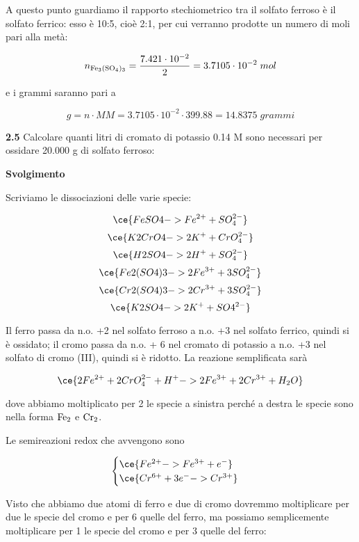 A questo punto guardiamo il rapporto stechiometrico tra il solfato ferroso è il solfato ferrico: esso è 10:5, cioè 2:1, per cui verranno prodotte un numero di moli pari alla metà:

$$n_{\rm Fe_3(SO_4)_3}=\frac{7.421 \cdot 10^{-2}}{2}=3.7105 \cdot 10^{-2}\;mol$$

e i grammi saranno pari a 

$$g=n \cdot MM=3.7105 \cdot 10^{-2} \cdot 399.88=14.8375\;grammi$$

\vspace{0.2cm}\textbf{2.5} Calcolare quanti litri di cromato di potassio 0.14 M sono necessari per ossidare 20.000 g di solfato ferroso:
\begin{center}

\end{center}

\large\textbf{Svolgimento}\normalsize

\vspace{0.2cm}Scriviamo le dissociazioni delle varie specie:

$$\ce{FeSO4 -> Fe^{2+} + SO_4^{2-}}$$
$$\ce{K2CrO4 -> 2K^+ + CrO_4^{2-}}$$
$$\ce{H2SO4 -> 2H^+ + SO_4^{2-}}$$
$$\ce{Fe2(SO4)3 -> 2Fe^{3+} + 3SO_4^{2-}}$$
$$\ce{Cr2(SO4)3 -> 2Cr^{3+} + 3SO_4^{2-}}$$
$$\ce{K2SO4 -> 2K^+ + SO4^{2-}}$$

Il ferro passa da n.o. +2 nel solfato ferroso a n.o. +3 nel solfato ferrico, quindi si è ossidato; il cromo passa da n.o. + 6 nel cromato di potassio a n.o. +3 nel solfato di cromo (III), quindi si è ridotto. La reazione semplificata sarà

$$\ce{2Fe^{2+} + 2CrO_4^{2-} + H^+ -> 2Fe^{3+} + 2Cr^{3+} + H_2O}$$

dove abbiamo moltiplicato per 2 le specie a sinistra perché a destra le specie sono nella forma $\rm Fe_2$ e $\rm Cr_2$.

Le semireazioni redox che avvengono sono

$$\begin{cases}
    \ce{Fe^{2+} -> Fe^{3+} + e^-}\\
    \ce{Cr^{6+} + 3e^- -> Cr^{3+}}
\end{cases}$$

Visto che abbiamo due atomi di ferro e due di cromo dovremmo moltiplicare per due le specie del cromo e per 6 quelle del ferro, ma possiamo semplicemente moltiplicare per 1 le specie del cromo e per 3 quelle del ferro:

